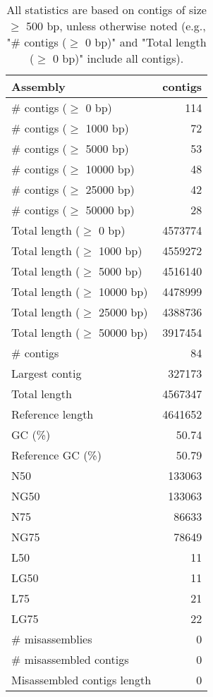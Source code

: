 \documentclass[12pt,a4paper]{article}
\begin{document}
\begin{table}[ht]
\begin{center}
\caption{All statistics are based on contigs of size $\geq$ 500 bp, unless otherwise noted (e.g., "\# contigs ($\geq$ 0 bp)" and "Total length ($\geq$ 0 bp)" include all contigs).}
\begin{tabular}{|l*{1}{|r}|}
\hline
Assembly & contigs \\ \hline
\# contigs ($\geq$ 0 bp) & 114 \\ \hline
\# contigs ($\geq$ 1000 bp) & 72 \\ \hline
\# contigs ($\geq$ 5000 bp) & 53 \\ \hline
\# contigs ($\geq$ 10000 bp) & 48 \\ \hline
\# contigs ($\geq$ 25000 bp) & 42 \\ \hline
\# contigs ($\geq$ 50000 bp) & 28 \\ \hline
Total length ($\geq$ 0 bp) & 4573774 \\ \hline
Total length ($\geq$ 1000 bp) & 4559272 \\ \hline
Total length ($\geq$ 5000 bp) & 4516140 \\ \hline
Total length ($\geq$ 10000 bp) & 4478999 \\ \hline
Total length ($\geq$ 25000 bp) & 4388736 \\ \hline
Total length ($\geq$ 50000 bp) & 3917454 \\ \hline
\# contigs & 84 \\ \hline
Largest contig & 327173 \\ \hline
Total length & 4567347 \\ \hline
Reference length & 4641652 \\ \hline
GC (\%) & 50.74 \\ \hline
Reference GC (\%) & 50.79 \\ \hline
N50 & 133063 \\ \hline
NG50 & 133063 \\ \hline
N75 & 86633 \\ \hline
NG75 & 78649 \\ \hline
L50 & 11 \\ \hline
LG50 & 11 \\ \hline
L75 & 21 \\ \hline
LG75 & 22 \\ \hline
\# misassemblies & 0 \\ \hline
\# misassembled contigs & 0 \\ \hline
Misassembled contigs length & 0 \\ \hline

\end{tabular}
\end{center}
\end{table}
\end{document}
